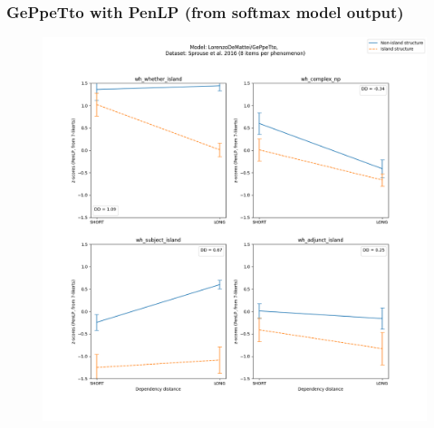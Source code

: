 \subsubsection{GePpeTto with PenLP (from softmax model output)}
\begin{figure}[h]
	\centering
	\includegraphics[width=1\textwidth]{images/AppendixA/Sprouse_wh_LorenzoDeMattei_GePpeTto_PenLP-zscores-likert-2022-07-11.png} 
\end{figure}

\clearpage
